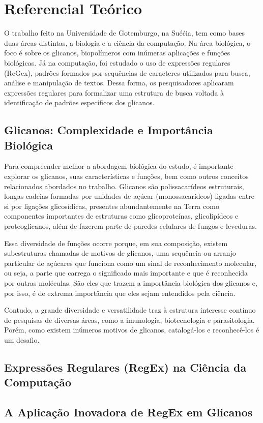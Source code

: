 \chapter{Referencial Teórico}

O trabalho feito na Universidade de Gotemburgo, na Suéćia, tem como bases duas áreas distintas, a biologia e a ciência da computação. Na área biológica, o foco é sobre os glicanos, biopolímeros com inúmeras aplicações e funções biológicas. Já na computação, foi estudado o uso de expressões regulares (ReGex), padrões formados por sequências de caracteres utilizados para busca, análise e manipulação de textos. Dessa forma, os pesquisadores aplicaram expressões regulares para formalizar uma estrutura de busca voltada à identificação de padrões específicos dos glicanos.

\section{Glicanos: Complexidade e Importância Biológica}

Para compreender melhor a abordagem biológica do estudo, é importante explorar os glicanos, suas características e funções, bem como outros conceitos relacionados abordados no trabalho. Glicanos são polissacarídeos estruturais, longas cadeias formadas por unidades de açúcar (monossacarídeos) ligadas entre si por ligações glicosídicas, presentes abundantemente na Terra como componentes importantes de estruturas como glicoproteínas, glicolipídeos e proteoglicanos, além de fazerem parte de paredes celulares de fungos e leveduras.

Essa diversidade de funções ocorre porque, em sua composição, existem subestruturas chamadas de motivos de glicanos, uma sequência ou arranjo particular de açúcares que funciona como um sinal de reconhecimento molecular, ou seja, a parte que carrega o significado mais importante e que é reconhecida por outras moléculas. São eles que trazem a importância biológica dos glicanos e, por isso, é de extrema importância que eles sejam entendidos pela ciência. 

Contudo, a grande diversidade e versatilidade traz à estrutura interesse contínuo de pesquisas de diversas áreas, como a imunologia, biotecnologia e parasitologia. Porém, como existem inúmeros motivos de glicanos, catalogá-los e reconhecê-los é um desafio.

\section{Expressões Regulares (RegEx) na Ciência da Computação}

\section{A Aplicação Inovadora de RegEx em Glicanos}

